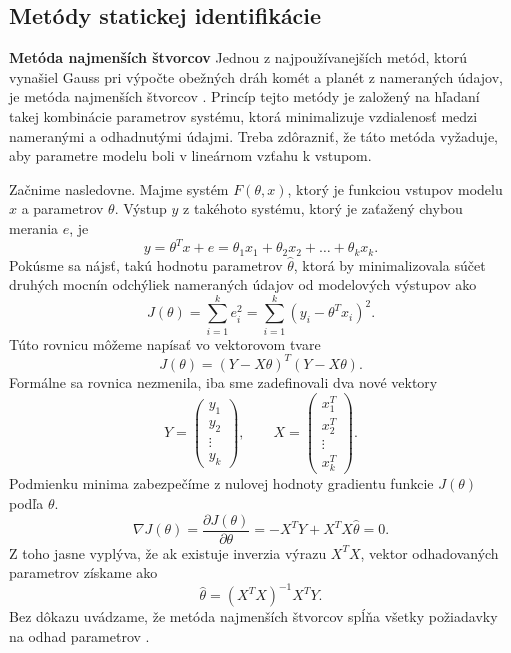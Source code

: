 \subsection{Metódy statickej identifikácie}
\textbf{Metóda najmenších štvorcov}
\newline
Jednou z najpoužívanejších metód, ktorú vynašiel Gauss pri výpočte obežných dráh komét a planét z nameraných údajov, je metóda najmenších štvorcov \cite{hostetter:recursive_est:1987}. Princíp tejto metódy je založený na hľadaní takej kombinácie parametrov systému, ktorá minimalizuje vzdialenosť medzi nameranými a odhadnutými údajmi. Treba zdôrazniť, že táto metóda vyžaduje, aby parametre modelu boli v lineárnom vzťahu k vstupom.

Začnime nasledovne. Majme systém $ F(\theta, x) $, ktorý je funkciou vstupov modelu $ x $ a parametrov $ \theta $. Výstup $ y $ z takéhoto systému, ktorý je zaťažený chybou merania $ e $, je
\begin{equation}
	y = \theta^T x + e = \theta_1x_1 + \theta_2x_2 + \dots + \theta_kx_k.
\end{equation}
Pokúsme sa nájsť, takú hodnotu parametrov $ \hat{\theta} $, ktorá by minimalizovala súčet druhých mocnín odchýliek nameraných údajov od modelových výstupov ako
\begin{equation}
	J\left(\theta\right) = \sum_{i=1}^{k} e_i^2 = \sum_{i=1}^{k} \left(y_i - \theta^T x_i\right)^2.
\end{equation}
Túto rovnicu môžeme napísať vo vektorovom tvare
\begin{equation}
	J\left(\theta\right) = \left(Y - X\theta \right)^T \left(Y - X\theta \right).
\end{equation} 
Formálne sa rovnica nezmenila, iba sme zadefinovali dva nové vektory
\begin{equation}
	Y = \begin{pmatrix}
			y_1 \\
			y_2 \\
			\vdots \\
			y_k
		\end{pmatrix}, \qquad
	X = \begin{pmatrix}
			x_1^T \\
			x_2^T \\
			\vdots \\
			x_k^T
		\end{pmatrix}.
\end{equation}
Podmienku minima zabezpečíme z nulovej hodnoty gradientu funkcie $ J(\theta) $ podľa $ \theta $.
\begin{equation}
	\nabla J \left(\theta\right) = \frac{\partial J \left(\theta\right)}{\partial \theta} = -X^T Y + X^T X\hat{\theta} = 0.
\end{equation}
Z toho jasne vyplýva, že ak existuje inverzia výrazu $ X^T X $, vektor odhadovaných parametrov získame ako 
\begin{equation}
	\hat{\theta} = \left(X^T X\right)^{-1}X^T Y.
\end{equation}
Bez dôkazu uvádzame, že metóda najmenších štvorcov spĺňa všetky požiadavky na odhad parametrov \cite{fikar:identifikacia:1999}.

